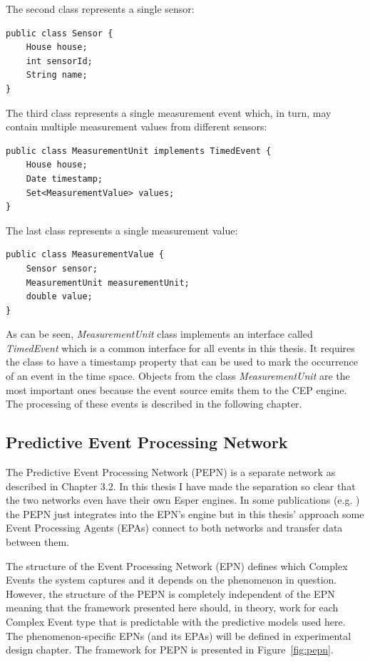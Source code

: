 The second class represents a single sensor:
\begin{Verbatim}[xleftmargin=1.5em]
public class Sensor {
	House house;
	int sensorId;
	String name;
}
\end{Verbatim}

The third class represents a single measurement event which, in turn, may contain multiple measurement values from different sensors:
\begin{Verbatim}[xleftmargin=1.5em]
public class MeasurementUnit implements TimedEvent {
	House house;
	Date timestamp;
	Set<MeasurementValue> values;
}
\end{Verbatim}

The last class represents a single measurement value:

\begin{Verbatim}[xleftmargin=1.5em]
public class MeasurementValue {
	Sensor sensor;
	MeasurementUnit measurementUnit;
	double value;
}
\end{Verbatim}

As can be seen, \emph{MeasurementUnit} class implements an interface called \emph{TimedEvent} which is a common interface for all events in this thesis. It requires the class to have a timestamp property that can be used to mark the occurrence of an event in the time space. Objects from the class \emph{MeasurementUnit} are the most important ones because the event source emits them to the CEP engine. The processing of these events is described in the following chapter.



\subsection{Predictive Event Processing Network}
The Predictive Event Processing Network (PEPN) is a separate network as described in Chapter 3.2. In this thesis I have made the separation so clear that the two networks even have their own Esper engines. In some publications (e.g. \cite{Fulop12}) the PEPN just integrates into the EPN's engine but in this thesis' approach some Event Processing Agents (EPAs) connect to both networks and transfer data between them. 

The structure of the Event Processing Network (EPN) defines which Complex Events the system captures and it depends on the phenomenon in question. However, the structure of the PEPN is completely independent of the EPN meaning that the framework presented here should, in theory, work for each Complex Event type that is predictable with the predictive models used here. The phenomenon-specific EPNs (and its EPAs) will be defined in experimental design chapter. The framework for PEPN is presented in Figure~\ref{fig:pepn}.

